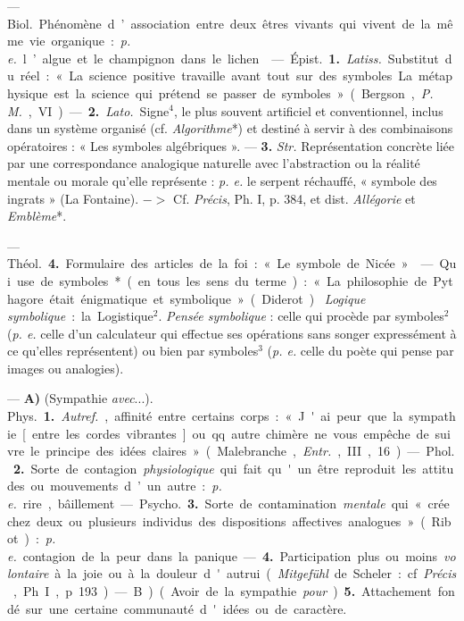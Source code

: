 \begin{itemize}[leftmargin=1cm, label=, itemsep=1pt]
 — \si{Biol.} Phénomène d’association entre deux êtres vivants
qui vivent de la même vie organique : {\it p. e.} l’algue et le champignon
dans le lichen.

 — \si{Épist.} {\bf 1.} {\it Latiss.} Substitut du réel : « La
science positive travaille avant tout sur des symboles... La métaphysique
est la science qui prétend se passer de symboles » (Bergson, {\it P. M.},
VI). — {\bf 2.} {\it Lato.} Signe$^4$, le plus souvent artificiel et
conventionnel, inclus dans un système organisé (cf. {\it Algorithme}*) et
destiné à servir à des combinaisons opératoires : « Les symboles algébriques
». — {\bf 3.} {\it Str.} Représentation concrète liée par une correspondance
analogique naturelle avec l’abstraction ou la réalité mentale ou morale
qu’elle représente : {\it p. e.} le serpent réchauffé, « symbole des ingrats
» (La Fontaine). $->$ Cf. {\it Précis}, Ph. I, p. 384, et dist. {\it
Allégorie} et {\it Emblème}*.

— \si{Théol.} {\bf 4.} Formulaire des articles de la foi : « Le symbole de
Nicée ».

 — Qui use de symboles* (en tous les sens du terme) : « La
philosophie de Pythagore était énigmatique et symbolique » (Diderot). {\it
Logique symbolique} : la Logistique$^2$. {\it Pensée symbolique} : celle qui
procède par symboles$^2$ ({\it p. e.} celle d’un calculateur
qui effectue ses opérations sans songer expressément à ce qu’elles
représentent) ou bien par symboles$^3$ ({\it p. e.} celle du poète qui pense
par images ou analogies).

 — {\bf A)} (Sympathie {\it avec}...). \si{Phys.} {\bf 1.}
{\it Autref.}, affinité entre certains corps : « J'ai peur que la sympathie
[entre les cordes vibrantes] ou qq. autre chimère ne vous empêche de suivre
le principe des idées claires » (Malebranche, {\it Entr.}, III, 16). —
\si{Phol.} {\bf 2.} Sorte de contagion {\it physiologique} qui fait qu'un
être reproduit les attitudes ou mouvements d’un autre : {\it p. e.} rire,
bâillement. — \si{Psycho.} {\bf 3.} Sorte de contamination {\it mentale} qui
« crée chez deux ou plusieurs individus des dispositions affectives
analogues » (Ribot) : {\it p. e.} contagion de la peur dans la panique. —
{\bf 4.} Participation plus ou moins {\it volontaire} à la joie ou à la
douleur d'autrui ({\it Mitgefühl} de Scheler : cf. {\it Précis}, Ph. I, p.
193).

— B) (Avoir de la sympathie {\it pour}...). {\bf 5.} Attachement fondé sur
une certaine communauté d'idées ou de caractère.


\end{itemize}
